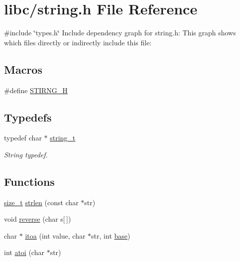 \hypertarget{a00128}{}\section{libc/string.h File Reference}
\label{a00128}
{\ttfamily \#include \char`\"{}types.\+h\char`\"{}}\newline
Include dependency graph for string.\+h\+:
This graph shows which files directly or indirectly include this file\+:
\subsection*{Macros}
\begin{DoxyCompactItemize}
\item 
\#define \hyperlink{a00128_a5338bd16a174527274acc5062483b702_a5338bd16a174527274acc5062483b702}{S\+T\+I\+R\+N\+G\+\_\+H}
\end{DoxyCompactItemize}
\subsection*{Typedefs}
\begin{DoxyCompactItemize}
\item 
typedef char $\ast$ \hyperlink{a00128_ab0dcbec9b4b3c60b939b1095f93cb1b9_ab0dcbec9b4b3c60b939b1095f93cb1b9}{string\+\_\+t}
\begin{DoxyCompactList}\small\item\em String typedef. \end{DoxyCompactList}\end{DoxyCompactItemize}
\subsection*{Functions}
\begin{DoxyCompactItemize}
\item 
\hyperlink{a00140_a29d85914ddff32967d85ada69854206d_a29d85914ddff32967d85ada69854206d}{size\+\_\+t} \hyperlink{a00128_a008e171a518fe0e0352f31b245e03875_a008e171a518fe0e0352f31b245e03875}{strlen} (const char $\ast$str)
\item 
void \hyperlink{a00128_aa8a9a8836962d890b4939c112fd29190_aa8a9a8836962d890b4939c112fd29190}{reverse} (char s\mbox{[}$\,$\mbox{]})
\item 
char $\ast$ \hyperlink{a00128_ab42640268f26e065efd044cfe80591bd_ab42640268f26e065efd044cfe80591bd}{itoa} (int value, char $\ast$str, int \hyperlink{a00110_a0523cedff47e2441fc198b7770ec5d3f_a0523cedff47e2441fc198b7770ec5d3f}{base})
\item 
int \hyperlink{a00128_a8456d79947fb428e0927d19e7a1e9423_a8456d79947fb428e0927d19e7a1e9423}{atoi} (char $\ast$str)
\end{DoxyCompactItemize}


